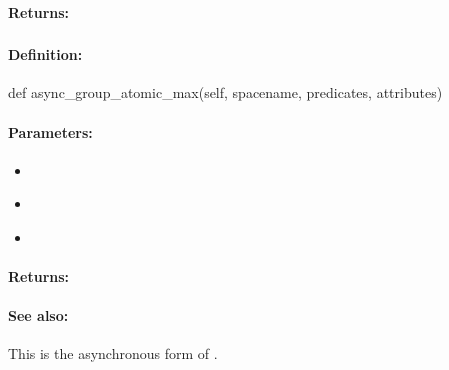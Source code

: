 \paragraph{Returns:}


\pagebreak
\subsubsection{}
\label{api:python:async_group_atomic_max}


\paragraph{Definition:}
\begin{pythoncode}
def async_group_atomic_max(self, spacename, predicates, attributes)
\end{pythoncode}

\paragraph{Parameters:}
\begin{itemize}[noitemsep]
\item {}\\

\item {}\\

\item {}\\

\end{itemize}

\paragraph{Returns:}


\paragraph{See also:}  This is the asynchronous form of .

\pagebreak
